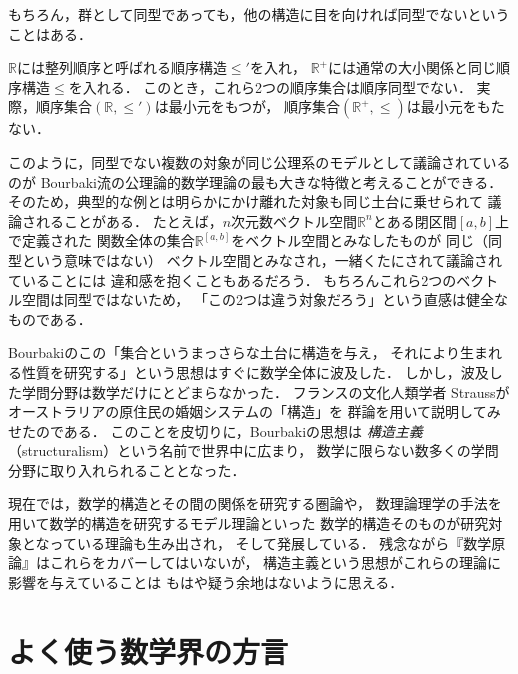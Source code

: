   もちろん，群として同型であっても，他の構造に目を向ければ同型でないということはある．

  \begin{ex} \label{ex:Rseinotdoukei}
    $\mathbb{R}$には整列順序と呼ばれる順序構造$\leq '$を入れ，
    $\mathbb{R}^+$には通常の大小関係と同じ順序構造$\leq$を入れる．
    このとき，これら2つの順序集合は順序同型でない．
    実際，順序集合$(\mathbb{R}, \leq ')$は最小元をもつが，
    順序集合$( \mathbb{R}^+ ,\leq) $は最小元をもたない．
  \end{ex}

  このように，同型でない複数の対象が同じ公理系のモデルとして議論されているのが
  Bourbaki流の公理論的数学理論の最も大きな特徴と考えることができる．
  そのため，典型的な例とは明らかにかけ離れた対象も同じ土台に乗せられて
  議論されることがある．
  たとえば，$n$次元数ベクトル空間$\mathbb{R}^n$とある閉区間$[a,b]$上で定義された
  関数全体の集合$\mathbb{R} ^{[a,b]}$をベクトル空間とみなしたものが
  同じ（同型という意味ではない）
  ベクトル空間とみなされ，一緒くたにされて議論されていることには
  違和感を抱くこともあるだろう．
  もちろんこれら2つのベクトル空間は同型ではないため，
  「この2つは違う対象だろう」という直感は健全なものである．

  Bourbakiのこの「集合というまっさらな土台に構造を与え，
  それにより生まれる性質を研究する」という思想はすぐに数学全体に波及した．
  しかし，波及した学問分野は数学だけにとどまらなかった．
  フランスの文化人類学者
  Straussがオーストラリアの原住民の婚姻システムの「構造」を
  群論を用いて説明してみせたのである．
  このことを皮切りに，Bourbakiの思想は
  \emph{構造主義}（structuralism）という名前で世界中に広まり，
  数学に限らない数多くの学問分野に取り入れられることとなった．

  現在では，数学的構造とその間の関係を研究する圏論や，
  数理論理学の手法を用いて数学的構造を研究するモデル理論といった
  数学的構造そのものが研究対象となっている理論も生み出され，
  そして発展している．
  残念ながら『数学原論』はこれらをカバーしてはいないが，
  構造主義という思想がこれらの理論に影響を与えていることは
  もはや疑う余地はないように思える．
  





  


  

  

\section{よく使う数学界の方言}
\label{sec:hougen}

